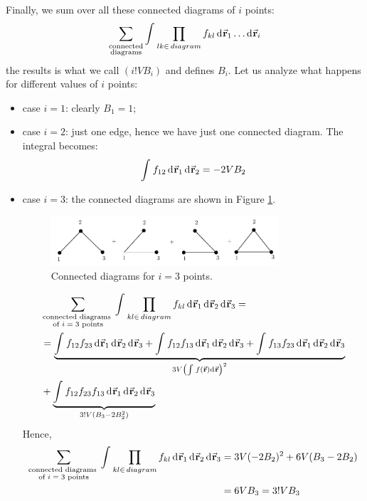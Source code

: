 \documentclass[../main/main.tex]{subfiles}
\begin{document}
\noindent Finally, we sum over all these connected diagrams of \( i \) points:
\begin{equation*}
  \sum_{\substack{ \text{connected} \\  \text{diagrams} } }^{}    \int_{}^{} \prod_{lk \in \, diagram }^{} f_{kl} \dd[]{\va{r}_1} \dots \dd[]{\va{r}_i}
\end{equation*}
the results is what we call \( (i! V B_i) \) and defines \( B_i \). Let us analyze what happens for different values of \( i \) points:
\begin{itemize}
\item case \( i=1 \): clearly  \( B_1 =1 \);
\item case \( i=2 \): just one edge, hence we have just one connected diagram. The integral becomes:
\begin{equation*}
  \int_{}^{} f_{12} \dd[]{\va{r}_1} \dd[]{\va{r}_2} = - 2 V B_2
\end{equation*}
\item case \( i=3 \): the connected diagrams are shown in Figure \ref{fig:15_7}.
\begin{figure}[h!]
\centering
\includegraphics[width=0.8\textwidth]{../lessons/15_image/10.pdf}
\caption{\label{fig:15_7} Connected diagrams for \( i=3 \) points.}
\end{figure}

\begin{equation*}
\begin{split}
  & \sum_{\substack{ \text{connected diagrams } \\ \text{of \( i=3 \) points}} }^{} \int_{}^{} \prod_{kl \in \, diagram }^{} f_{kl} \dd[]{\va{r}_1}   \dd[]{\va{r}_2}    \dd[]{\va{r}_3} = \\
   &=  \underbrace{ \int_{}^{} f_{12} f_{23} \dd[]{\va{r}_1} \dd[]{\va{r}_2} \dd[]{\va{r}_3}
    + \int_{}^{} f_{12}f_{13} \dd[]{\va{r}_1} \dd[]{\va{r}_2} \dd[]{\va{r}_3}
    + \int_{}^{} f_{13}f_{23} \dd[]{\va{r}_1} \dd[]{\va{r}_2} \dd[]{\va{r}_3} }_{3 V \qty(\int_{}^{} f (\va{r})\dd[]{\va{r}}  )^2 }   \\
  & + \underbrace{\int_{}^{} f_{12} f_{23} f_{13} \dd[]{\va{r}_1} \dd[]{\va{r}_2} \dd[]{\va{r}_3}}_{3! V (B_3 - 2 B_2^2)}
\end{split}
\end{equation*}
Hence,
\begin{equation*}
\begin{split}
  \sum_{\substack{ \text{connected diagrams } \\ \text{of \( i=3 \) points}} }^{} \int_{}^{} \prod_{kl \in \, diagram }^{} f_{kl} \dd[]{\va{r}_1}   \dd[]{\va{r}_2}    \dd[]{\va{r}_3}
  & = 3 V (-2B_2)^2 + 6V (B_3 - 2 B_2) \\
  & = 6V B_3 = 3! V B_3
\end{split}
\end{equation*}

\end{itemize}
\end{document}
